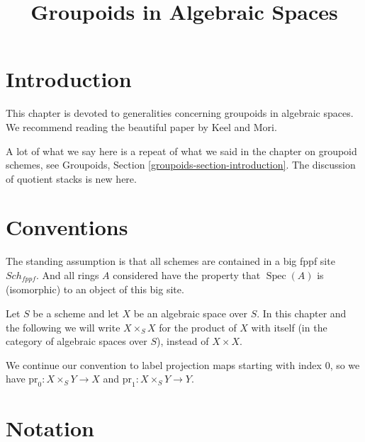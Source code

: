 \documentclass{stacks-project}
\theoremstyle{plain}
\theoremstyle{definition}
\theoremstyle{remark}
\numberwithin{equation}{subsection}
\def\Spec{\mathop{\mathrm{Spec}}}
\def\Sch{\mathit{Sch}}
\begin{document}
\title{Groupoids in Algebraic Spaces}


\maketitle

\label{section-phantom}

\tableofcontents

\section{Introduction}
\label{section-introduction}

\noindent
This chapter is devoted to generalities concerning groupoids in algebraic
spaces. We recommend reading the beautiful paper \cite{K-M} by Keel and Mori.

\medskip\noindent
A lot of what we say here is a repeat of what we said in the chapter
on groupoid schemes, see
Groupoids, Section \ref{groupoids-section-introduction}.
The discussion of quotient stacks is new here.


\section{Conventions}
\label{section-conventions}

\noindent
The standing assumption is that all schemes are contained in
a big fppf site $\Sch_{fppf}$. And all rings $A$ considered
have the property that $\Spec(A)$ is (isomorphic) to an
object of this big site.

\medskip\noindent
Let $S$ be a scheme and let $X$ be an algebraic space over $S$.
In this chapter and the following we will write $X \times_S X$
for the product of $X$ with itself (in the category of algebraic
spaces over $S$), instead of $X \times X$.

\medskip\noindent
We continue our convention to label projection maps starting with
index $0$, so we have $\text{pr}_0 : X \times_S Y \to X$ and
$\text{pr}_1 : X \times_S Y \to Y$.




\section{Notation}
\label{section-notation}
\end{document}
